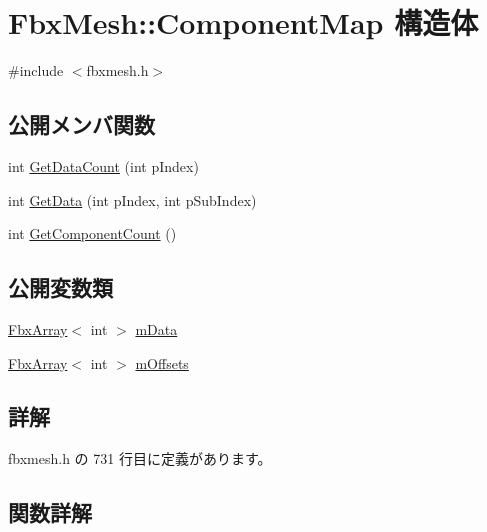 \hypertarget{struct_fbx_mesh_1_1_component_map}{}\section{Fbx\+Mesh\+:\+:Component\+Map 構造体}
\label{struct_fbx_mesh_1_1_component_map}


{\ttfamily \#include $<$fbxmesh.\+h$>$}

\subsection*{公開メンバ関数}
\begin{DoxyCompactItemize}
\item 
int \hyperlink{struct_fbx_mesh_1_1_component_map_a8aa6116c655638c97e9a769262bccbaa}{Get\+Data\+Count} (int p\+Index)
\item 
int \hyperlink{struct_fbx_mesh_1_1_component_map_a7fe2d0917dfc8c689704d2e38ed5082f}{Get\+Data} (int p\+Index, int p\+Sub\+Index)
\item 
int \hyperlink{struct_fbx_mesh_1_1_component_map_a51ee2a75c37cc4a7209c41fcb5e745ab}{Get\+Component\+Count} ()
\end{DoxyCompactItemize}
\subsection*{公開変数類}
\begin{DoxyCompactItemize}
\item 
\hyperlink{class_fbx_array}{Fbx\+Array}$<$ int $>$ \hyperlink{struct_fbx_mesh_1_1_component_map_a8ee6102745a5ff75b15584d1fba94c52}{m\+Data}
\item 
\hyperlink{class_fbx_array}{Fbx\+Array}$<$ int $>$ \hyperlink{struct_fbx_mesh_1_1_component_map_a1228c1a961435c616f98d14a7d853414}{m\+Offsets}
\end{DoxyCompactItemize}


\subsection{詳解}


 fbxmesh.\+h の 731 行目に定義があります。



\subsection{関数詳解}
\mbox{\label{struct_fbx_mesh_1_1_component_map_a51ee2a75c37cc4a7209c41fcb5e745ab}} 
